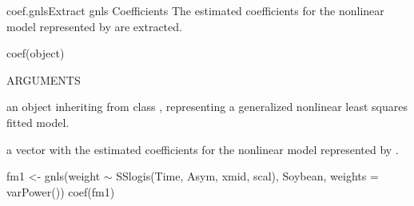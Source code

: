 \documentclass[pdftex]{article} \usepackage{url,graphicx}
\renewcommand{\Twiddle}{\mbox{\(\sim\)}}
\begin{document}
\begin{Helpfile}{coef.gnls}{Extract gnls Coefficients}
The estimated coefficients for the nonlinear model represented by
 are extracted.
\begin{Example}
coef(object)
\end{Example}
\begin{Argument}{ARGUMENTS}
\item[\Co{object:}]
an object inheriting from class , representing
a generalized nonlinear least squares fitted model.
\end{Argument}
a vector with the estimated coefficients for the nonlinear model
represented by .
\need 15pt
\vspace{-16pt}
\begin{Example}
fm1 <- gnls(weight {\Twiddle} SSlogis(Time, Asym, xmid, scal), Soybean,
            weights = varPower())
coef(fm1)
\end{Example}
\end{Helpfile}
\end{document}
